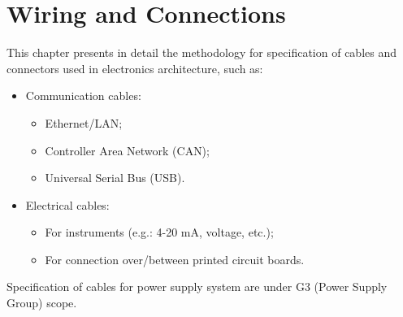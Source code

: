 



\chapter{Wiring and Connections} \label{CHAPTER_WIRING}
This chapter presents in detail the methodology for specification of cables and connectors used in electronics architecture, such as:
\begin{itemize}
    \item Communication cables:
    \begin{itemize}
        \item Ethernet/LAN;
        \item Controller Area Network (CAN);
        \item Universal Serial Bus (USB).
    \end{itemize}
    \item Electrical cables:
    \begin{itemize}
        \item For instruments (e.g.: 4-20 mA, voltage, etc.);
        \item For connection over/between printed circuit boards.
    \end{itemize}
\end{itemize}
Specification of cables for power supply system are under G3 (Power Supply Group) scope.
\newpage




